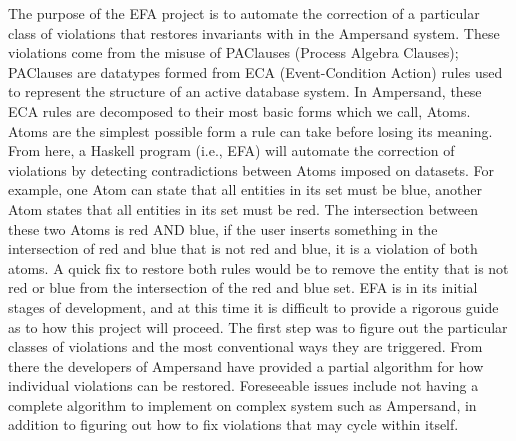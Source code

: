 \documentclass[12pt]{article}
\begin{document}
\newline
\indent The purpose of the EFA project is to automate the correction of a 
particular 
class of violations that restores invariants with in the Ampersand system. 
These violations come from the misuse of PAClauses (Process Algebra Clauses); 
PAClauses are datatypes formed from ECA (Event-Condition Action) rules used to 
represent the structure of an active database system. In Ampersand, these ECA 
rules are decomposed to their most basic forms which we call, Atoms. Atoms are 
the simplest possible form a rule can take before losing its meaning. From 
here, a Haskell program (i.e., EFA) will automate the correction of violations 
by detecting contradictions between Atoms imposed on datasets. For example, one 
Atom can state that all entities in its set must be blue, another Atom states 
that all entities in its set must be red. The intersection between these two 
Atoms is red AND blue, if the user inserts something in the intersection of red 
and blue that is not red and blue, it is a violation of both atoms. A quick fix 
to restore both rules would be to remove the entity that is not red or blue 
from the intersection of the red and blue set. 
\newline
\indent EFA is in its initial stages of development, and at this time it is 
difficult 
to provide a rigorous guide as to how this project will proceed. The first step 
was to figure out the particular classes of violations and the most 
conventional ways they are triggered. From there the developers of Ampersand 
have provided a partial algorithm for how individual violations can be 
restored. Foreseeable issues include not having a complete algorithm to 
implement on complex system such as Ampersand, in addition to figuring out how 
to fix violations that may cycle within itself.
\end{document}
